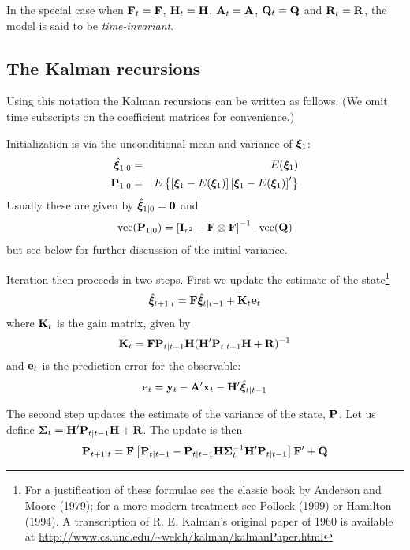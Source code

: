 \documentclass[a4paper]{article}
\newcommand{\obsvec}{\ensuremath\mathbf{y}}
\newcommand{\obsmat}{\ensuremath\mathbf{H}}
\newcommand{\obsx}{\ensuremath\mathbf{x}}
\newcommand{\obsxmat}{\ensuremath\mathbf{A}}
\newcommand{\obsvar}{\ensuremath\mathbf{R}}
\newcommand{\statevec}{\ensuremath\mathbf{\bm \xi}}
\newcommand{\statemat}{\ensuremath\mathbf{F}}
\newcommand{\strvar}{\ensuremath\mathbf{Q}}
\newcommand{\statevar}{\ensuremath\mathbf{P}}
\newcommand{\gain}{\ensuremath\mathbf{K}}
\newcommand{\prederr}{\ensuremath\mathbf{e}}
\newcommand{\predvar}{\ensuremath{\bm\Sigma}}
\newcommand{\myvec}{\mbox{vec}}
\begin{document}
In the special case when $\statemat_t = \statemat$, $\obsmat_t = \obsmat$,
$\obsxmat_t = \obsxmat$, $\strvar_t = \strvar$ and $\obsvar_t =
\obsvar$, the model is said to be \emph{time-invariant}.

\subsection{The Kalman recursions}

Using this notation the Kalman recursions can be written as follows.
(We omit time subscripts on the coefficient matrices for convenience.)

Initialization is via the unconditional mean and variance of
$\statevec_1$:
%
\begin{eqnarray*}
\hat{\statevec}_{1|0} &=& E(\statevec_1) \\
\statevar_{1|0} &=& E\left\{\left[\statevec_1 - E(\statevec_1)\right]
   \left[\statevec_1 - E(\statevec_1)\right]' \right\}
\end{eqnarray*}
Usually these are given by $\hat{\statevec}_{1|0} = \mathbf{0}$ and
\begin{equation}
\label{eq:inivar}
\myvec(\statevar_{1|0}) = \left[\mathbf{I}_{r^2} - \statemat \otimes
  \statemat\right]^{-1} \cdot \myvec(\strvar)
\end{equation}
but see below for further discussion of the initial variance.

Iteration then proceeds in two steps.  First we update the estimate of
the state\footnote{For a justification of these formulae see the
  classic book by Anderson and Moore (1979); for a more modern
  treatment see Pollock (1999) or Hamilton (1994).  A transcription of
  R. E. Kalman's original paper of 1960 is available at
  \url{http://www.cs.unc.edu/~welch/kalman/kalmanPaper.html}}
%
\begin{equation}
\hat{\statevec}_{t+1|t} = \statemat\hat{\statevec}_{t|t-1} + 
  \gain_t \prederr_t
\end{equation}
%
where $\gain_t$ is the gain matrix, given by
%
\[
\gain_t = \statemat\statevar_{t|t-1}\obsmat
  (\obsmat'\statevar_{t|t-1}\obsmat + \obsvar)^{-1}
\]
%
and $\prederr_t$ is the prediction error for the observable:
\[
\prederr_t = \obsvec_t - \obsxmat'\obsx_t - \obsmat' \hat{\statevec}_{t|t-1}
\]

The second step updates the estimate of the variance of the state,
$\statevar$.  Let us define $\predvar_t =
\obsmat'\statevar_{t|t-1}\obsmat + \obsvar$.  The update is then
\begin{equation}
\statevar_{t+1|t} = \statemat\left[\statevar_{t|t-1} -
 \statevar_{t|t-1}\obsmat \predvar_t^{-1}
 \obsmat' \statevar_{t|t-1} \right] \statemat' + \strvar
\end{equation}
\end{document}
